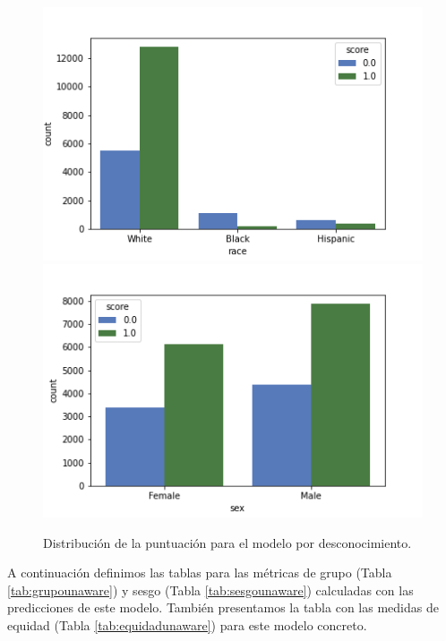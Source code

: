\documentclass[oneside,openright,titlepage,numbers=noenddot,openany,headinclude,footinclude=true,
cleardoublepage=empty,abstractoff,BCOR=5mm,paper=a4,fontsize=12pt,main=spanish]{scrreprt}
\begin{document}
\begin{figure}[H]
      \includegraphics[width=\linewidth]{images/score_unaware_race_law.png}
    \endminipage\hfill
      \includegraphics[width=\linewidth]{images/score_unaware_sex_law.png}
    \endminipage
     \caption{Distribución de la puntuación para el modelo por desconocimiento.}
     \label{fig:scoreunaware}
\end{figure}

A continuación definimos las tablas para las métricas de grupo (Tabla \ref{tab:grupounaware}) y sesgo (Tabla \ref{tab:sesgounaware}) calculadas con las predicciones de este modelo. También presentamos la tabla con las medidas de equidad (Tabla \ref{tab:equidadunaware}) para este modelo concreto.\\
\end{document}
